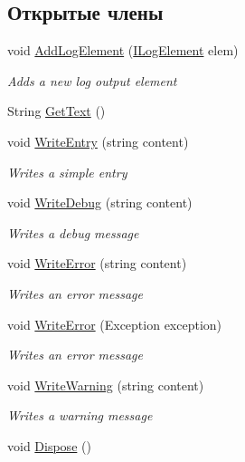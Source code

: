 \subsection*{Открытые члены}
\begin{DoxyCompactItemize}
\item 
void \hyperlink{class_logger_1_1_logger_a811509da41ba54f4fb1ce45a50ee2f4c}{Add\+Log\+Element} (\hyperlink{interface_logger_1_1_i_log_element}{I\+Log\+Element} elem)
\begin{DoxyCompactList}\small\item\em Adds a new log output element \end{DoxyCompactList}\item 
String \hyperlink{class_logger_1_1_logger_ac8b9cdb189a9e8b8f830051527308e7c}{Get\+Text} ()
\item 
void \hyperlink{class_logger_1_1_logger_a21da357b867b66bf03eb34b972b27e87}{Write\+Entry} (string content)
\begin{DoxyCompactList}\small\item\em Writes a simple entry \end{DoxyCompactList}\item 
void \hyperlink{class_logger_1_1_logger_a78d866035bb84b6d9a91e4cc9cd26ee3}{Write\+Debug} (string content)
\begin{DoxyCompactList}\small\item\em Writes a debug message \end{DoxyCompactList}\item 
void \hyperlink{class_logger_1_1_logger_a24c21fa616eb7ab3e8b0dcaa3dfce902}{Write\+Error} (string content)
\begin{DoxyCompactList}\small\item\em Writes an error message \end{DoxyCompactList}\item 
void \hyperlink{class_logger_1_1_logger_a4162a54dd74252bb985488d1aceb3fbe}{Write\+Error} (Exception exception)
\begin{DoxyCompactList}\small\item\em Writes an error message \end{DoxyCompactList}\item 
void \hyperlink{class_logger_1_1_logger_a773ede85257be28172b09b61d1e21fd9}{Write\+Warning} (string content)
\begin{DoxyCompactList}\small\item\em Writes a warning message \end{DoxyCompactList}\item 
void \hyperlink{class_logger_1_1_logger_a77b75d0fc462c3a38b8c3f3a5007f842}{Dispose} ()
\end{DoxyCompactItemize}
